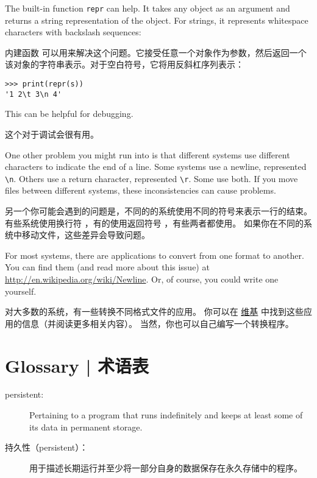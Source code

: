 {{{{{{{The built-in function {\tt repr} can help.  It takes any object as an
argument and returns a string representation of the object.  For
strings, it represents whitespace
characters with backslash sequences:

内建函数  可以用来解决这个问题。它接受任意一个对象作为参数，然后返回一个该对象的字符串表示。对于空白符号，它将用反斜杠序列表示：

\begin{lstlisting}
>>> print(repr(s))
'1 2\t 3\n 4'
\end{lstlisting}

This can be helpful for debugging.

这个对于调试会很有用。

One other problem you might run into is that different systems
use different characters to indicate the end of a line.  Some
systems use a newline, represented \verb"\n".  Others use
a return character, represented \verb"\r".  Some use both.
If you move files between different systems, these inconsistencies
can cause problems.

另一个你可能会遇到的问题是，不同的的系统使用不同的符号来表示一行的结束。
有些系统使用换行符 ，有的使用返回符号 \li{\r} ，有些两者都使用。
如果你在不同的系统中移动文件，这些差异会导致问题。

For most systems, there are applications to convert from one
format to another.  You can find them (and read more about this
issue) at \url{http://en.wikipedia.org/wiki/Newline}.  Or, of course, you
could write one yourself.

对大多数的系统，有一些转换不同格式文件的应用。 
你可以在 \href{http://en.wikipedia.org/wiki/Newline}{维基} 中找到这些应用的信息（并阅读更多相关内容）。 当然，你也可以自己编写一个转换程序。


\section{Glossary  |  术语表}

\begin{description}

\item[persistent:] Pertaining to a program that runs indefinitely
and keeps at least some of its data in permanent storage.

\item[持久性（persistent）：] 用于描述长期运行并至少将一部分自身的数据保存在永久存储中的程序。


\end{description}}}}}}}}
